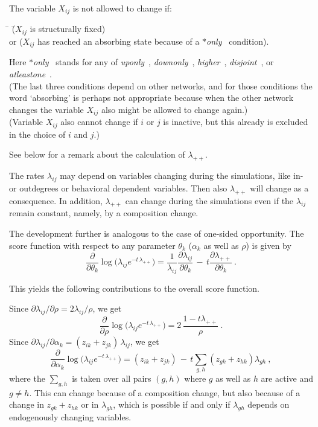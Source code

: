 \documentclass[a4paper,12pt,fleqn]{article}
\newcommand{\nnm}[1]{\textsf{\small\textit{#1}\ }}
\begin{document}
The variable $X_{ij}$ is not allowed to change if:
\begin{tabbing}
\hspace*{3em} \=  \hspace*{3em} \=  ($X_{ij}$ is structurally fixed) \\
       \> or \> ($X_{ij}$ has reached an absorbing state because of a \nnm{$\ast$only} condition).
\end{tabbing}
Here \nnm{$\ast$only} stands for any of \nnm{uponly}, \nnm{downonly}, \nnm{higher},
\nnm{disjoint}, or \nnm{atleastone}.\\
(The last three conditions depend on other networks, and for those conditions
the word `absorbing' is perhaps not appropriate
because when the other network changes the variable $X_{ij}$ also might be allowed to change again.)
\\
(Variable $X_{ij}$ also cannot change if $i$ or $j$ is inactive, but this already is excluded
in the choice of $i$ and $j$.)

See below for a remark about the calculation of $\lambda_{++}$.

The rates $\lambda_{ij}$ may depend on variables changing during the simulations, like
in- or outdegrees or behavioral dependent variables. Then also $\lambda_{++}$ will change
as a consequence. In addition,  $\lambda_{++}$ can change during the simulations
even if the $\lambda_{ij}$ remain constant, namely,  by a composition change.

The development further is analogous to the case of one-sided opportunity.
The score function with respect to any parameter
$\theta_k$ ($\alpha_k$ as well as $\rho$) is given by
\[
    \frac{\partial }{\partial \theta_k} \log \Big( \lambda_{ij} e^{-t\,\lambda_{++}} \Big)
  = \frac{1}{\lambda_{ij}} \frac{\partial \lambda_{ij}}{\partial \theta_k} \, - \,
  t  \frac{\partial \lambda_{++}}{\partial \theta_k} \ .
\]


This yields the following contributions to the overall score function.

Since $\partial \lambda_{ij}/\partial \rho = 2 \lambda_{ij}/\rho$, we get
\begin{equation}
    \frac{\partial }{\partial \rho} \log \Big( \lambda_{ij} e^{-t\,\lambda_{++}} \Big)
  = 2\, \frac{1 - t \lambda_{++}}{\rho}  \ .   \label{eq:scorelambda2r}
\end{equation}
Since $\partial \lambda_{ij}/\partial \alpha_k = (z_{ik}+z_{jk})\,\lambda_{ij}$, we get
\begin{equation}
    \frac{\partial }{\partial \alpha_k} \log \Big( \lambda_{ij} e^{-t\,\lambda_{++}} \Big)
  = (z_{ik}+z_{jk}) \,-\, t \sum_{g,h} (z_{gk}+z_{hk})\lambda_{gh}  \ ,   \label{eq:scorelambda2ak}
\end{equation}
where the $\sum_{g,h}$ is taken over
all pairs $(g,h)$ where $g$ as well as $h$ are active and $g \neq h$.
This can change because of a composition change, but also because of a change in $z_{gk}+z_{hk}$
or in $\lambda_{gh}$,
which is possible if and only if  $\lambda_{gh}$ depends on endogenously changing variables.
\end{document}
